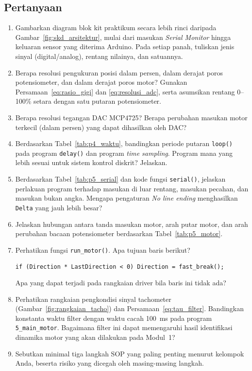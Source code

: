 \documentclass[11pt,a4paper]{article}
\newcommand{\prog}[1]{\texttt{#1}}
\begin{document}
\subsection{Pertanyaan}
\label{sec:pertanyaan}
\begin{enumerate}
	\item Gambarkan diagram blok kit praktikum secara lebih rinci daripada Gambar~\ref{fig:skd_arsitektur}, mulai dari masukan \textit{Serial Monitor} hingga keluaran sensor yang diterima Arduino. Pada setiap panah, tuliskan jenis sinyal (digital/analog), rentang nilainya, dan satuannya.
	\item Berapa resolusi pengukuran posisi dalam persen, dalam derajat poros potensiometer, dan dalam derajat poros motor? Gunakan Persamaan~\eqref{eq:rasio_gigi} dan \eqref{eq:resolusi_adc}, serta asumsikan rentang 0--100\% setara dengan satu putaran potensiometer.
	\item Berapa resolusi tegangan DAC MCP4725? Berapa perubahan masukan motor terkecil (dalam persen) yang dapat dihasilkan oleh DAC?
	\item Berdasarkan Tabel~\ref{tab:p4_waktu}, bandingkan periode putaran \texttt{loop()} pada program \texttt{delay()} dan program \textit{time sampling}. Program mana yang lebih sesuai untuk sistem kontrol diskrit? Jelaskan.
	\item Berdasarkan Tabel~\ref{tab:p5_serial} dan kode fungsi \texttt{serial()}, jelaskan perlakuan program terhadap masukan di luar rentang, masukan pecahan, dan masukan bukan angka. Mengapa pengaturan \textit{No line ending} menghasilkan \texttt{Delta} yang jauh lebih besar?
	\item Jelaskan hubungan antara tanda masukan motor, arah putar motor, dan arah perubahan bacaan potensiometer berdasarkan Tabel~\ref{tab:p5_motor}.
	\item Perhatikan fungsi \texttt{run\_motor()}. Apa tujuan baris berikut?
	      \begin{center}\texttt{if (Direction * LastDirection < 0) Direction = fast\_break();}\end{center}
	      Apa yang dapat terjadi pada rangkaian driver bila baris ini tidak ada?
	\item Perhatikan rangkaian pengkondisi sinyal tachometer (Gambar~\ref{fig:rangkaian_tacho}) dan Persamaan~\eqref{eq:tau_filter}. Bandingkan konstanta waktu filter dengan waktu cacah 100~ms pada program \prog{5\_main\_motor}. Bagaimana filter ini dapat memengaruhi hasil identifikasi dinamika motor yang akan dilakukan pada Modul~1?
	\item Sebutkan minimal tiga langkah SOP yang paling penting menurut kelompok Anda, beserta risiko yang dicegah oleh masing-masing langkah.
\end{enumerate}
\end{document}
